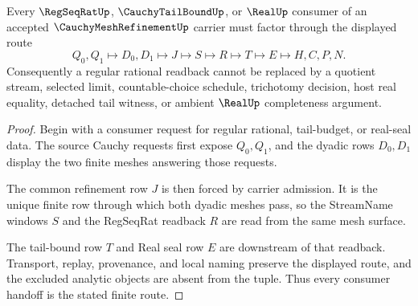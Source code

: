 \begin{theorem}
\label{thm:cauchy-mesh-refinement-regseqrat-handoff}
Every $\RegSeqRatUp$, $\CauchyTailBoundUp$, or $\RealUp$ consumer of an accepted $\CauchyMeshRefinementUp$ carrier must factor through the displayed route
$$
Q_0,Q_1 \longmapsto D_0,D_1 \longmapsto J \longmapsto S \longmapsto R \longmapsto T \longmapsto E \longmapsto H,C,P,N .
$$
Consequently a regular rational readback cannot be replaced by a quotient stream, selected limit, countable-choice schedule, trichotomy decision, host real equality, detached tail witness, or ambient $\RealUp$ completeness argument.
\end{theorem}
\begin{proof}
Begin with a consumer request for regular rational, tail-budget, or real-seal data. The source Cauchy requests first expose $Q_0,Q_1$, and the dyadic rows $D_0,D_1$ display the two finite meshes answering those requests.

The common refinement row $J$ is then forced by carrier admission. It is the unique finite row through which both dyadic meshes pass, so the StreamName windows $S$ and the RegSeqRat readback $R$ are read from the same mesh surface.

The tail-bound row $T$ and Real seal row $E$ are downstream of that readback. Transport, replay, provenance, and local naming preserve the displayed route, and the excluded analytic objects are absent from the tuple. Thus every consumer handoff is the stated finite route.
\end{proof}


\begin{closurestatus}{\CauchyMeshRefinementUp}
  \theoryclosure{\seedClosure}
  \formalstatus{\unformalizedV}
\end{closurestatus}
